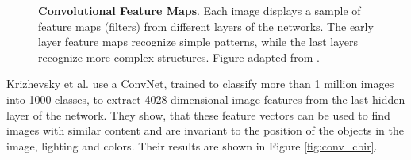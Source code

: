 \documentclass[12pt]{report}
\begin{document}
\begin{figure}[h]
\centering
{}\hspace{.3cm}
\hspace{.3cm}
\caption{\label{fig:conv_feats} \textbf{Convolutional Feature Maps}. Each image displays a sample of feature maps (filters) from different layers of the networks. The early layer feature maps recognize simple patterns, while the last layers recognize more complex structures. Figure adapted from \cite{gandhi_build_2018}.}
\end{figure}


Krizhevsky et al. \cite{NIPS2012_4824} use a ConvNet, trained to classify more than 1 million images into 1000 classes, to extract 4028-dimensional image features from the last hidden layer of the network. They show, that these feature vectors can be used to find images with similar content and are invariant to the position of the objects in the image, lighting and colors. Their results are shown in Figure \ref{fig:conv_cbir}.
\end{document}
